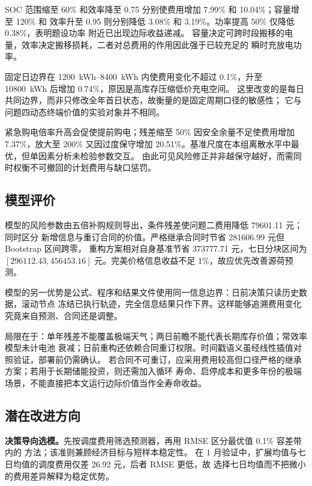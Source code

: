 \documentclass[withoutpreface,bwprint]{cumcmthesis}
\begin{document}
SOC 范围缩至 60\% 和效率降至 0.75 分别使费用增加 7.99\% 和 10.04\%；容量增至 120\% 和
效率升至 0.95 则分别降低 3.08\% 和 3.19\%。功率提高 50\% 仅降低 0.38\%，表明题设功率
附近已出现边际收益递减。
容量决定可跨时段搬移的电量，效率决定搬移损耗，二者对总费用的作用因此强于已较充足的
瞬时充放电功率。

固定日边界在 \SIrange{1200}{8400}{kWh} 内使费用变化不超过 0.1\%，升至
\SI{10800}{kWh} 后增加 0.74\%，原因是高库存压缩低价充电空间。
这里改变的是每日共同边界，而非只修改全年首日状态，故衡量的是固定周期口径的敏感性；
它与问题四动态终端价值的实验对象并不相同。

紧急购电倍率升高会促使提前购电；残差缩至 50\% 因安全余量不足使费用增加 7.37\%，放大至
200\% 又因过度保守增加 20.51\%。基准尺度在本组离散水平中最优，但单因素分析未检验参数交互。
由此可见风险修正并非越保守越好，而需同时权衡不可撤回的计划费用与缺口惩罚。

\subsection{模型评价}

模型的风险参数由五倍补购规则导出，条件残差使问题二费用降低 \num{79601.11} 元；同时区分
新增信息与重订合同的价值。严格继承合同时节省 \num{281606.99} 元但 Bootstrap 区间跨零，
重构方案相对自身基准节省 \num{373777.71} 元，七日分块区间为
$[\num{296112.43},\num{456453.16}]$ 元。完美价格信息收益不足 1\%，故应优先改善源荷预测。

模型的另一优势是公式、程序和结果文件使用同一信息边界：日前决策只读历史数据，滚动节点
冻结已执行轨迹，完全信息结果只作下界。这样能够追溯费用变化究竟来自预测、合同还是调整。

局限在于：单年残差不能覆盖极端天气；两日前瞻不能代表长期库存价值；常效率模型未计电池
衰减；日前重构还依赖合同重订权限。时间戳语义虽经线性插值对照验证，部署前仍需确认。
若合同不可重订，应采用费用较高但口径严格的继承方案；若用于长期储能投资，则还需加入循环
寿命、启停成本和更多年份的极端场景，不能直接把本文运行边际价值当作全寿命收益。

\subsection{潜在改进方向}

\textbf{决策导向选模。}先按调度费用筛选预测器，再用 RMSE 区分最优值 0.1\% 容差带内的
方法；该准则兼顾经济目标与短样本稳定性。
在 1 月验证中，扩展均值与七日均值的调度费用仅差 \num{26.92} 元，后者 RMSE 更低，故
选择七日均值而不把微小的费用差异解释为稳定优势。
\end{document}
